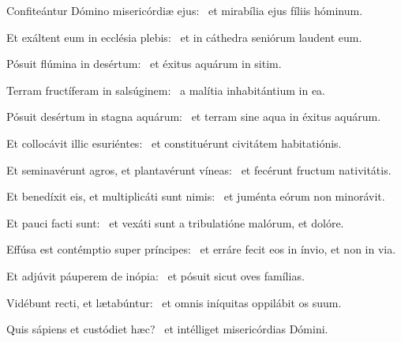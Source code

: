
\item Confiteántur Dómino misericórdiæ ejus:~\psstar{} et mirabília ejus fíliis hóminum.

\item Et exáltent eum in ecclésia plebis:~\psstar{} et in cáthedra seniórum laudent eum.

\item Pósuit flúmina in desértum:~\psstar{} et éxitus aquárum in sitim.

\item Terram fructíferam in salsúginem:~\psstar{} a malítia inhabitántium in ea.

\item Pósuit desértum in stagna aquárum:~\psstar{} et terram sine aqua in éxitus aquárum.

\item Et collocávit illic esuriéntes:~\psstar{} et constituérunt civitátem habitatiónis.

\item Et seminavérunt agros, et plantavérunt víneas:~\psstar{} et fecérunt fructum nativitátis.

\item Et benedíxit eis, et multiplicáti sunt nimis:~\psstar{} et juménta eórum non minorávit.

\item Et pauci facti sunt:~\psstar{} et vexáti sunt a tribulatióne malórum, et dolóre.

\item Effúsa est contémptio super príncipes:~\psstar{} et erráre fecit eos in ínvio, et non in via.

\item Et adjúvit páuperem de inópia:~\psstar{} et pósuit sicut oves famílias.

\item Vidébunt recti, et lætabúntur:~\psstar{} et omnis iníquitas oppilábit os suum.

\item Quis sápiens et custódiet hæc?~\psstar{} et intélliget misericórdias Dómini.